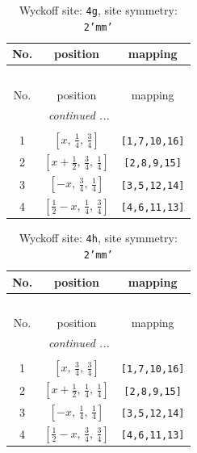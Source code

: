 \documentclass[fleqn,8pt]{jsarticle}
\begin{document}
\renewcommand{\arraystretch}{1.2}
\begin{longtable}{ccc}
\caption{Wyckoff site: {\tt 4g}, site symmetry: {\tt 2'mm'}}
 \\
 \hline \hline
No. & position & mapping \\ \hline \endfirsthead

\multicolumn{2}{l}{\tablename\ \thetable{}} \\
 \hline \hline
No. & position & mapping \\ \hline \endhead

 \hline \hline
\multicolumn{2}{r}{\footnotesize\it continued ...} \\ \endfoot

 \hline \hline
\multicolumn{2}{r}{} \\ \endlastfoot

1 & $\left[ x,\, \frac{1}{4},\, \frac{3}{4} \right]$ & {\tt [1,7,10,16]} \\ \hline
2 & $\left[ x + \frac{1}{2},\, \frac{3}{4},\, \frac{1}{4} \right]$ & {\tt [2,8,9,15]} \\ \hline
3 & $\left[ - x,\, \frac{3}{4},\, \frac{1}{4} \right]$ & {\tt [3,5,12,14]} \\ \hline
4 & $\left[ \frac{1}{2} - x,\, \frac{1}{4},\, \frac{3}{4} \right]$ & {\tt [4,6,11,13]} \\
\end{longtable}
\renewcommand{\arraystretch}{1.2}
\begin{longtable}{ccc}
\caption{Wyckoff site: {\tt 4h}, site symmetry: {\tt 2'mm'}}
 \\
 \hline \hline
No. & position & mapping \\ \hline \endfirsthead

\multicolumn{2}{l}{\tablename\ \thetable{}} \\
 \hline \hline
No. & position & mapping \\ \hline \endhead

 \hline \hline
\multicolumn{2}{r}{\footnotesize\it continued ...} \\ \endfoot

 \hline \hline
\multicolumn{2}{r}{} \\ \endlastfoot

1 & $\left[ x,\, \frac{3}{4},\, \frac{3}{4} \right]$ & {\tt [1,7,10,16]} \\ \hline
2 & $\left[ x + \frac{1}{2},\, \frac{1}{4},\, \frac{1}{4} \right]$ & {\tt [2,8,9,15]} \\ \hline
3 & $\left[ - x,\, \frac{1}{4},\, \frac{1}{4} \right]$ & {\tt [3,5,12,14]} \\ \hline
4 & $\left[ \frac{1}{2} - x,\, \frac{3}{4},\, \frac{3}{4} \right]$ & {\tt [4,6,11,13]} \\
\end{longtable}
\end{document}
